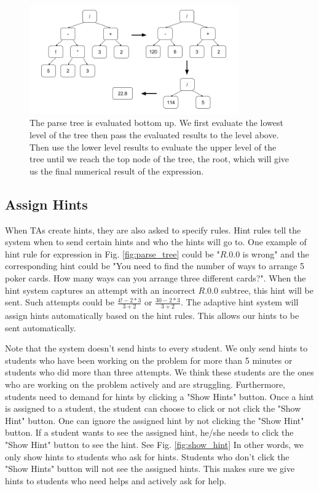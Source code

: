 \documentclass{llncs}
\begin{document}
\begin{figure}[ht]
   \centering
   \includegraphics[width=0.8\textwidth]{image/Eval_Trees.png}
   \caption{The parse tree is evaluated bottom up. We first evaluate the lowest level of the tree then pass the evaluated results to the level above. Then use the lower level results to evaluate the upper level of the tree until we reach the top node of the tree, the root, which will give us the final numerical result of the expression.}
   \label{fig:eval_tree}
\end{figure}


\subsection*{Assign Hints}
When TAs create hints, they are also asked to specify rules. Hint rules tell the system when to send certain hints and who the hints will go to. One example of hint rule for expression in Fig. \ref{fig:parse_tree} could be "$R.0.0$ is wrong" and the corresponding hint could be "You need to find the number of ways to arrange 5 poker cards. How many ways can you arrange three different cards?". When the hint system captures an attempt with an incorrect $R.0.0$ subtree, this hint will be sent. Such attempts could be $\frac{4!-2*3}{3+2}$ or $\frac{30-2*3}{3+2}$. The adaptive hint system will assign hints automatically based on the hint rules. This allows our hints to be sent automatically.

Note that the system doesn't send hints to every student. We only send hints to students who have been working on the problem for more than 5 minutes or students who did more than three attempts. We think these students are the ones who are working on the problem actively and are struggling. Furthermore, students need to demand for hints by clicking a "Show Hints" button. Once a hint is assigned to a student, the student can choose to click or not click the "Show Hint" button. One can ignore the assigned hint by not clicking the "Show Hint" button. If a student wants to see the assigned hint, he/she needs to click the "Show Hint" button to see the hint. See Fig. \ref{fig:show_hint} In other words, we only show hints to students who ask for hints. Students who don't click the "Show Hints" button will not see the assigned hints. This makes sure we give hints to students who need helps and actively ask for help. 
\end{document}
